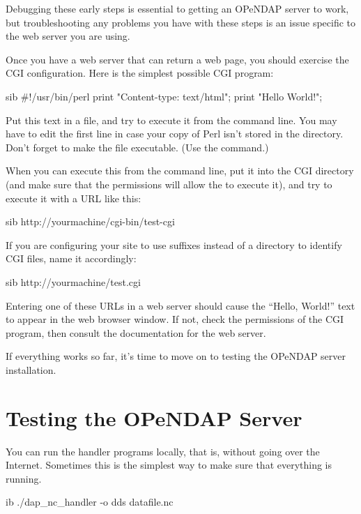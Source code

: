 \documentclass{dods-book}
\begin{document}
Debugging these early steps is essential to getting an OPeNDAP server
to work, but troubleshooting any problems you have with these steps is
an issue specific to the web server you are using.

Once you have a web server that can return a web page, you should
exercise the CGI configuration.  Here is the simplest possible CGI
program: \label{simple,perl}

\begin{vcode}{sib}
#!/usr/bin/perl
print "Content-type: text/html\n\n";
print "Hello World!\n\n";
\end{vcode}

Put this text in a file, and try to execute it from the command line.
You may have to edit the first line in case your copy of Perl isn't
stored in the  directory. Don't forget to make the file
executable. (Use the  command.)

When you can execute this from the command line, put it into the CGI
directory (and make sure that the permissions will allow the
 to execute it), and try to execute it with a URL like
this:

\begin{vcode}{sib}
http://yourmachine/cgi-bin/test-cgi
\end{vcode}

If you are configuring your site to use suffixes instead of a
directory to identify CGI files, name it accordingly:

\begin{vcode}{sib}
http://yourmachine/test.cgi
\end{vcode}

Entering one of these URLs in a web server should cause the ``Hello,
World!'' text to appear in the web browser window.  If not, check the
permissions of the CGI program, then consult the documentation for the
web server.

If everything works so far, it's time to move on to testing the
OPeNDAP server installation.  

\section{Testing the OPeNDAP Server}

You can run the handler programs locally, that is, without going over
the Internet.  Sometimes this is the simplest way to make sure that
everything is running.  

\begin{vcode}{ib}
./dap_nc_handler -o dds  datafile.nc
\end{vcode}
\end{document}
